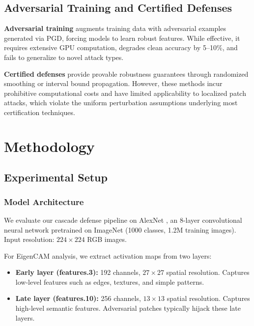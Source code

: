 \documentclass[conference]{IEEEtran}
\begin{document}
\subsection{Adversarial Training and Certified Defenses}

\textbf{Adversarial training} \cite{madry2018towards} augments training data with adversarial examples generated via PGD, forcing models to learn robust features. While effective, it requires extensive GPU computation, degrades clean accuracy by 5--10\%, and fails to generalize to novel attack types.

\textbf{Certified defenses} \cite{cohen2019certified} provide provable robustness guarantees through randomized smoothing or interval bound propagation. However, these methods incur prohibitive computational costs and have limited applicability to localized patch attacks, which violate the uniform perturbation assumptions underlying most certification techniques.

\section{Methodology}

\subsection{Experimental Setup}

\subsubsection{Model Architecture}

We evaluate our cascade defense pipeline on AlexNet \cite{krizhevsky2012imagenet}, an 8-layer convolutional neural network pretrained on ImageNet (1000 classes, 1.2M training images). Input resolution: $224\times224$ RGB images.

For EigenCAM analysis, we extract activation maps from two layers:
\begin{itemize}
\item \textbf{Early layer (features.3):} 192 channels, $27\times27$ spatial resolution. Captures low-level features such as edges, textures, and simple patterns.
\item \textbf{Late layer (features.10):} 256 channels, $13\times13$ spatial resolution. Captures high-level semantic features. Adversarial patches typically hijack these late layers.
\end{itemize}
\end{document}
